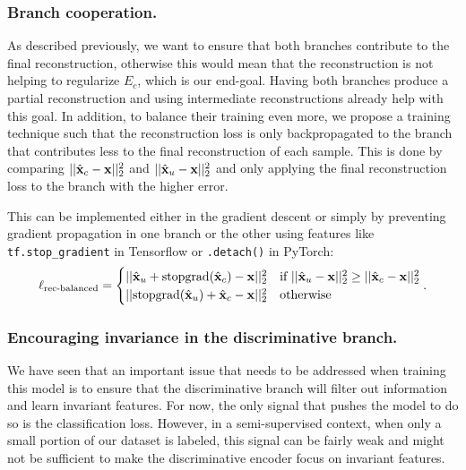 \documentclass[runningheads]{llncs}
\begin{document}
\subsubsection{Branch cooperation.} As described previously, we want to ensure that both branches contribute to the final reconstruction, otherwise this would mean that the reconstruction is not helping to regularize $E_c$, which is our end-goal. Having both branches produce a partial reconstruction and using intermediate reconstructions already help with this goal. In addition, to balance their training even more, we propose a training technique such that the reconstruction loss is only backpropagated to the branch that contributes less to the final reconstruction of each sample. This is done by comparing $||\hat{\mathbf{x}}_c - \mathbf{x}||_2^2$ and $||\hat{\mathbf{x}}_u - \mathbf{x}||_2^2$ and only applying the final reconstruction loss to the branch with the higher error.

This can be implemented either in the gradient descent or simply by preventing gradient propagation in one branch or the other using features like \texttt{tf.stop\_gradient} in Tensorflow or \texttt{.detach()} in PyTorch:
\begin{equation}
	\mathcal \ell_\textrm{rec-balanced} = \begin{cases}
    	||\hat{\mathbf{x}}_u + \mathrm{stopgrad}(\hat{\mathbf{x}}_c) - \mathbf{x}||_2^2&\text{if }||\hat{\mathbf{x}}_u - \mathbf{x}||_2^2 \geq ||\hat{\mathbf{x}}_c - \mathbf{x}||_2^2\\
        ||\mathrm{stopgrad}(\hat{\mathbf{x}}_u) + \hat{\mathbf{x}}_c - \mathbf{x}||_2^2&\text{otherwise}\\
    \end{cases} .
\end{equation}

\subsubsection{Encouraging invariance in the discriminative branch.}

We have seen that an important issue that needs to be addressed when training this model is to ensure that the discriminative branch will filter out information and learn invariant features. For now, the only signal that pushes the model to do so is the classification loss. However, in a semi-supervised context, when only a small portion of our dataset is labeled, this signal can be fairly weak and might not be sufficient to make the discriminative encoder focus on invariant features.
\end{document}
